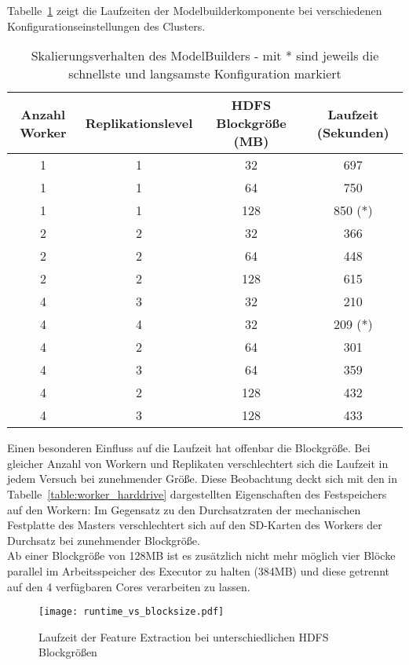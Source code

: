 Tabelle~\ref{table:scaling} zeigt die Laufzeiten der Modelbuilderkomponente bei verschiedenen Konfigurationseinstellungen des Clusters.

\begin{table}[ht]
	\centering %
	\begin{tabular}{c c c c} %
	\hline\hline %
	Anzahl Worker & Replikationslevel & HDFS Blockgröße (MB) & Laufzeit (Sekunden) \\ [0.5ex] %
	\hline %
	1 & 1 & 32 & 697 \\ %
	1 & 1 & 64 & 750 \\
	1 & 1 & 128 & 850 (*)\\
	2 & 2 & 32 & 366 \\
	2 & 2 & 64 & 448 \\
	2 & 2 & 128 & 615 \\
	4 & 3 & 32 & 210 \\
	4 & 4 & 32 & 209 (*)\\
	4 & 2 & 64 & 301 \\
	4 & 3 & 64 & 359 \\
	4 & 2 & 128 & 432 \\
	4 & 3 & 128 & 433 \\ [1ex] 
	\hline %
	\end{tabular}
	\caption{Skalierungsverhalten des ModelBuilders - mit * sind jeweils die schnellste und langsamste Konfiguration markiert} %
	\label{table:scaling} %
\end{table}

Einen besonderen Einfluss auf die Laufzeit hat offenbar die Blockgröße. Bei gleicher Anzahl von Workern und Replikaten verschlechtert sich die Laufzeit in jedem Versuch bei zunehmender Größe. Diese Beobachtung deckt sich mit den in Tabelle~\ref{table:worker_harddrive} dargestellten Eigenschaften des Festspeichers auf den Workern: 
Im Gegensatz zu den Durchsatzraten der mechanischen Festplatte des Masters verschlechtert sich auf den SD-Karten des Workers der Durchsatz bei zunehmender Blockgröße.\\
Ab einer Blockgröße von 128MB ist es zusätzlich nicht mehr möglich vier Blöcke parallel im Arbeitsspeicher des Executor zu halten (384MB) und diese getrennt auf den 4 verfügbaren Cores verarbeiten zu lassen.

\begin{figure}[ht!]
	\centering
  \texttt{[image: runtime\_vs\_blocksize.pdf]}
	\caption{Laufzeit der Feature Extraction bei unterschiedlichen HDFS Blockgrößen}
	\label{figure:runtime_vs_blocksize}
\end{figure}

